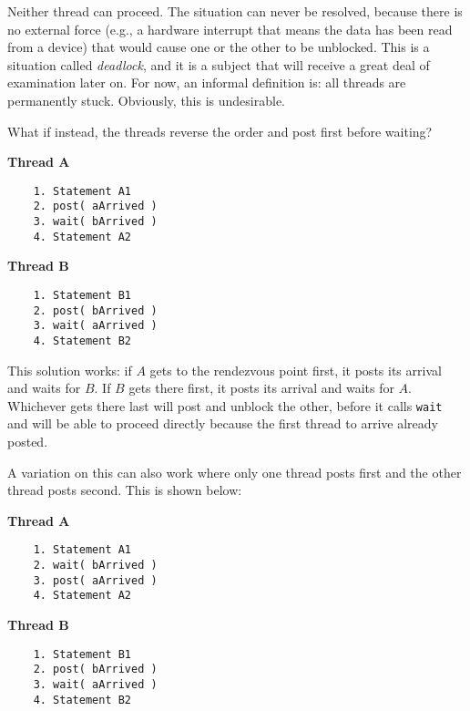 Neither thread can proceed. The situation can never be resolved, because there is no external force (e.g., a hardware interrupt that means the data has been read from a device) that would cause one or the other to be unblocked. This is a situation called \textit{deadlock}, and it is a subject that will receive a great deal of examination later on. For now, an informal definition is: all threads are permanently stuck. Obviously, this is undesirable.

What if instead, the threads reverse the order and post first before waiting?

\begin{multicols}{2}
	\textbf{Thread A}\vspace{-2em}
	\begin{verbatim}
	1. Statement A1
	2. post( aArrived )
	3. wait( bArrived )
	4. Statement A2
  \end{verbatim}
	\columnbreak
	\textbf{Thread B}\vspace{-2em}
	\begin{verbatim}
	1. Statement B1
	2. post( bArrived )
	3. wait( aArrived )
	4. Statement B2
  \end{verbatim}
\end{multicols}
\vspace{-2em}

This solution works: if $A$ gets to the rendezvous point first, it posts its arrival and waits for $B$. If $B$ gets there first, it posts its arrival and waits for $A$. Whichever gets there last will post and unblock the other, before it calls \texttt{wait} and will be able to proceed directly because the first thread to arrive already posted.

A variation on this can also work where only one thread posts first and the other thread posts second. This is shown below:

\begin{multicols}{2}
	\textbf{Thread A}\vspace{-2em}
	\begin{verbatim}
	1. Statement A1
	2. wait( bArrived )
	3. post( aArrived )
	4. Statement A2
  \end{verbatim}
	\columnbreak
	\textbf{Thread B}\vspace{-2em}
	\begin{verbatim}
	1. Statement B1
	2. post( bArrived )
	3. wait( aArrived )
	4. Statement B2
  \end{verbatim}
\end{multicols}
\vspace{-2em}

